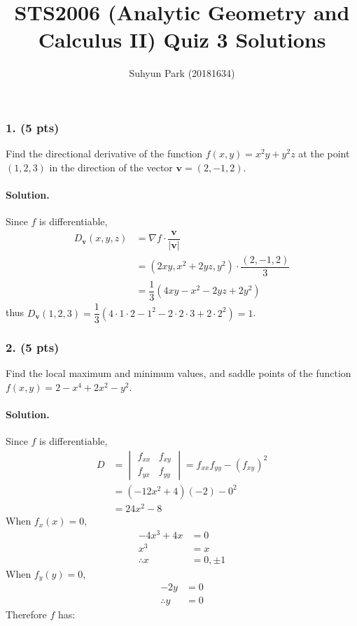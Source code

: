 \documentclass[runningheads]{llncs}
\begin{document}
\title{STS2006 (Analytic Geometry and Calculus II) \newline Quiz 3 Solutions}
\author{Suhyun Park (20181634)}
\maketitle

\subsubsection{1. (5 pts)} Find the directional derivative of the function $f\left(x, y\right)=x^2y+y^2z$ at the point $\left(1, 2, 3\right)$ in the direction of the vector $\mathbf{v}=\left(2, -1, 2\right)$.

\paragraph{Solution.} Since $f$ is differentiable,
\begin{align*}
	D_{\mathbf{v}}\left(x, y, z\right)
	&= \nabla f\cdot\dfrac{\mathbf{v}}{\left|\mathbf{v}\right|}\\
	&= \left(2xy, x^2+2yz, y^2\right)\cdot\dfrac{\left(2, -1, 2\right)}{3}\\
	&= \dfrac{1}{3}\left(4xy-x^2-2yz+2y^2\right)
\end{align*}
thus $D_{\mathbf{v}}\left(1, 2, 3\right)=\dfrac{1}{3}\left(4\cdot1\cdot2-1^2-2\cdot2\cdot3+2\cdot2^2\right)=1$.
\par

\subsubsection{2. (5 pts)} Find the local maximum and minimum values, and saddle points of the function $f\left(x, y\right)=2-x^4+2x^2-y^2$.

\paragraph{Solution.} Since $f$ is differentiable,
\begin{align*}
	D &= \begin{vmatrix}
    		f_{xx} & f_{xy} \\
    		f_{yx} & f_{yy}
  		\end{vmatrix} = f_{xx}f_{yy}-\left(f_{xy}\right)^2\\
  	&= \left(-12x^2+4\right)\left(-2\right)-0^2\\
  	&= 24x^2-8
\end{align*}
When $f_x\left(x\right)=0$,
\begin{align*}
	-4x^3+4x&=0\\
	x^3&=x\\
	\therefore x&=0, \pm1
\end{align*}
When $f_y\left(y\right)=0$,
\begin{align*}
	-2y&=0\\
	\therefore y&=0
\end{align*}
Therefore $f$ has:
\end{document}
